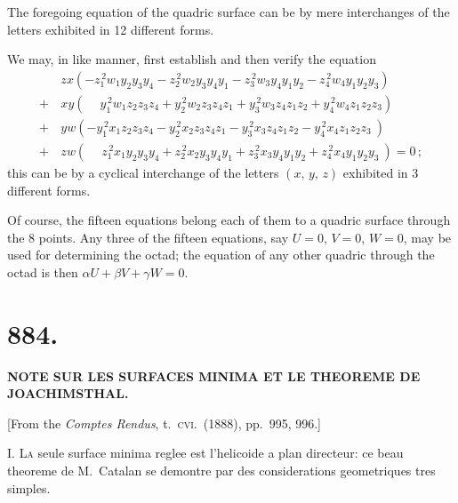 \documentclass[11pt,a4paper]{article}
\theoremstyle{plain}
\theoremstyle{definition}
\begin{document}
The foregoing equation of the quadric surface can be by mere interchanges of the letters exhibited in 12 different forms.

We may, in like manner, first establish and then verify the equation
\begin{align*}
&zx(-z_1^{\,2}w_1y_2y_3y_4 - z_2^{\,2}w_2y_3y_4y_1 - z_3^{\,2}w_3y_4y_1y_2 - z_4^{\,2}w_4y_1y_2y_3) \\
+\, &xy(\phantom{-}y_1^{\,2}w_1z_2z_3z_4 + y_2^{\,2}w_2z_3z_4z_1 + y_3^{\,2}w_3z_4z_1z_2 + y_4^{\,2}w_4z_1z_2z_3) \\
+\, &yw(-y_1^{\,2}x_1z_2z_3z_4 - y_2^{\,2}x_2z_3z_4z_1 - y_3^{\,2}x_3z_4z_1z_2 - y_4^{\,2}x_4z_1z_2z_3\ ) \\
+\, &zw(\phantom{-}z_1^{\,2}x_1y_2y_3y_4 + z_2^{\,2}x_2y_3y_4y_1 + z_3^{\,2}x_3y_4y_1y_2 + z_4^{\,2}x_4y_1y_2y_3\ ) = 0\,;
\end{align*}
this can be by a cyclical interchange of the letters $(x,\, y,\, z)$ exhibited in 3 different forms.

Of course, the fifteen equations belong each of them to a quadric surface through the 8 points. Any three of the fifteen equations, say $U=0$, $V=0$, $W=0$, may be used for determining the octad; the equation of any other quadric through the octad is then $\alpha U + \beta V + \gamma W = 0$.


\newpage
\section*{884.}

\begin{center}
\textbf{NOTE SUR LES SURFACES MINIMA ET LE THEOREME DE JOACHIMSTHAL.}
\end{center}

\begin{center}
[From the \textit{Comptes Rendus}, t.\ \textsc{cvi}.\ (1888), pp.\ 995, 996.]
\end{center}

\textsc{I.} \textsc{La} seule surface minima reglee est l'helicoide a plan directeur: ce beau theoreme de M.~Catalan se demontre par des considerations geometriques tres simples.
\end{document}
